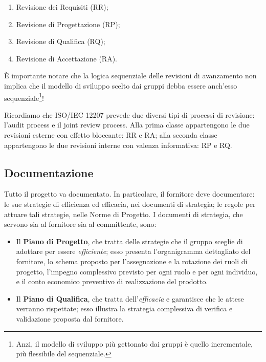 \documentclass[a4paper]{article}
\begin{document}
	\begin{enumerate}
		
			
	\item Revisione dei Requisiti (RR);
			
	\item Revisione di Progettazione (RP);
			
	\item Revisione di Qualifica (RQ);
			
	\item Revisione di Accettazione (RA).
		
	\end{enumerate}

		
È importante notare che la logica sequenziale delle revisioni di avanzamento non implica che il modello di sviluppo scelto dai gruppi debba essere anch'esso sequenziale\footnote{Anzi, il modello di sviluppo più gettonato dai gruppi è quello incrementale, più flessibile del sequenziale.}!
		
Ricordiamo che ISO/IEC 12207 prevede due diversi tipi di processi di revisione: l'audit process e il joint review process. Alla prima classe appartengono le due revisioni esterne con effetto bloccante: RR e RA; alla seconda classe appartengono le due revisioni interne con valenza informativa: RP e RQ.

		
	\subsection{Documentazione}

		
Tutto il progetto va documentato. In particolare, il fornitore deve documentare: le sue strategie di efficienza ed efficacia, nei documenti di strategia; le regole per attuare tali strategie, nelle Norme di Progetto. I documenti di strategia, che servono sia al fornitore sia al committente, sono:
		
	\begin{itemize}
		
			
	\item Il \textbf{Piano di Progetto}, che tratta delle strategie che il gruppo sceglie di adottare per essere \emph{efficiente}; esso presenta l'organigramma dettagliato del fornitore, lo schema proposto per l'assegnazione e la rotazione dei ruoli di progetto, l'impegno complessivo previsto per ogni ruolo e per ogni individuo, e il conto economico preventivo di realizzazione del prodotto.
			
	\item Il \textbf{Piano di Qualifica}, che tratta dell'\emph{efficacia} e garantisce che le attese verranno rispettate; esso illustra la strategia complessiva di verifica e validazione proposta dal fornitore.
		
	\end{itemize}
\end{document}
